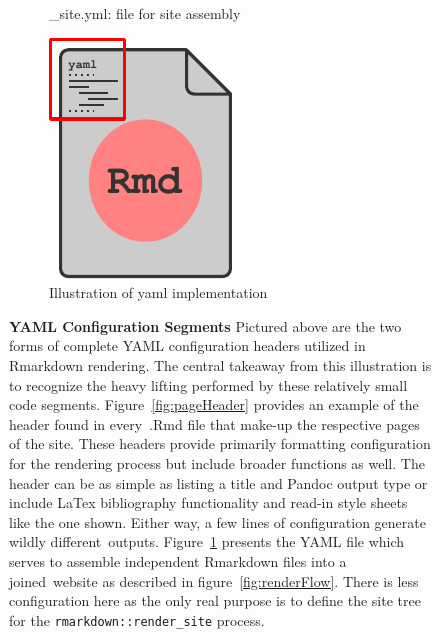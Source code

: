 \documentclass[10pt]{report}
\begin{document}
\begin{figure}
\begin{subfigure}[t]{.3\textwidth}
\caption{\_site.yml: file for site assembly}\label{fig:siteYaml}
\end{subfigure}
\hspace{2em}
\begin{subfigure}[t]{.2\textwidth}
    \centering
    \includegraphics[width=\textwidth]{fig/yaml_illustration.pdf}
\caption{Illustration of yaml implementation}\label{fig:yamlIllust}
\end{subfigure}
\caption[YAML Configuration Segments]{\textbf{YAML Configuration Segments} Pictured above are the two forms of complete YAML configuration headers utilized in Rmarkdown rendering. The central takeaway from this illustration is to recognize the heavy lifting performed by these relatively small code segments. Figure~\ref{fig:pageHeader} provides an example of the header found in every~.Rmd file that make-up the respective pages of the site. These headers provide primarily formatting configuration for the rendering process but include broader functions as well. The header can be as simple as listing a title and Pandoc output type or include LaTex bibliography functionality and read-in style sheets like the one shown. Either way, a few lines of configuration generate wildly different outputs. Figure~\ref{fig:siteYaml} presents the YAML file which serves to assemble independent Rmarkdown files into a joined website as described in figure~\ref{fig:renderFlow}. There is less configuration here as the only real purpose is to define the site tree for the \texttt{rmarkdown::render\_site} process.}\label{fig:yamls}
\end{figure}
\end{document}
